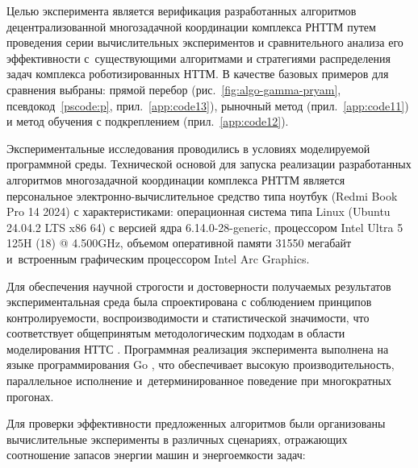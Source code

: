 Целью эксперимента является верификация разработанных алгоритмов децентрализованной многозадачной координации комплекса РНТТМ путем проведения серии вычислительных экспериментов и сравнительного анализа его эффективности с~существующими алгоритмами и стратегиями распределения задач комплекса роботизированных НТТМ. В качестве базовых примеров для сравнения выбраны: прямой перебор (рис.~\ref{fig:algo-gamma-pryam}, псевдокод~\ref{pscode:p}, прил.\ \ref{app:code13}), рыночный метод \cite{dias2006market} (прил.\ \ref{app:code11}) и метод обучения с подкреплением \cite{KoshmanovaTrifonovPavlovskii2012} (прил.\ \ref{app:code12}).

Экспериментальные исследования проводились в условиях моделируемой программной среды. Технической основой для запуска реализации разработанных алгоритмов многозадачной координации комплекса РНТТМ является персональное электронно-вычислительное средство типа ноутбук (Redmi Book Pro 14 2024) с характеристиками: операционная система типа Linux (Ubuntu 24.04.2 LTS x86 64) с версией ядра 6.14.0-28-generic, процессором Intel Ultra 5 125H (18) @ 4.500GHz, объемом оперативной памяти 31550 мегабайт и~встроенным графическим процессором Intel Arc Graphics.

Для обеспечения научной строгости и достоверности получаемых результатов экспериментальная среда была спроектирована с соблюдением принципов контролируемости, воспроизводимости и статистической значимости, что соответствует общепринятым методологическим подходам в области моделирования НТТС \cite{SandanEvtukov, Vilman}. Программная реализация эксперимента выполнена на языке программирования Go \cite{progbib1}, что обеспечивает высокую производительность, параллельное исполнение и~детерминированное поведение при многократных прогонах.

Для проверки эффективности предложенных алгоритмов были организованы вычислительные эксперименты в различных сценариях, отражающих соотношение запасов энергии машин и энергоемкости задач:

